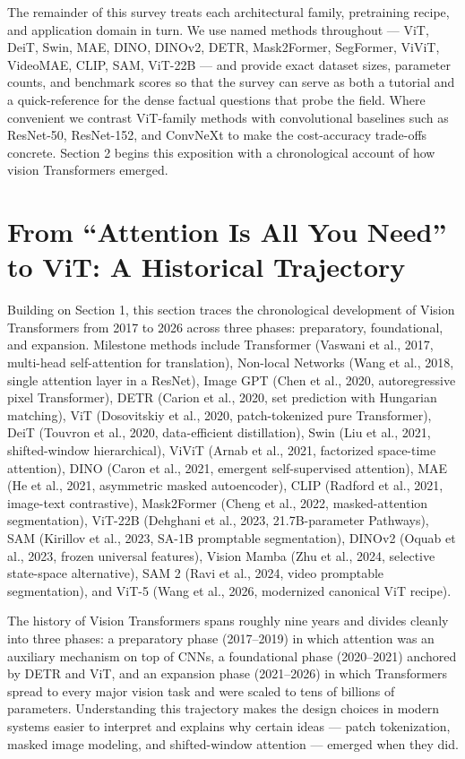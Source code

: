 The remainder of this survey treats each architectural family, pretraining recipe, and application domain in turn. We use named methods throughout --- ViT, DeiT, Swin, MAE, DINO, DINOv2, DETR, Mask2Former, SegFormer, ViViT, VideoMAE, CLIP, SAM, ViT-22B --- and provide exact dataset sizes, parameter counts, and benchmark scores so that the survey can serve as both a tutorial and a quick-reference for the dense factual questions that probe the field. Where convenient we contrast ViT-family methods with convolutional baselines such as ResNet-50, ResNet-152, and ConvNeXt to make the cost-accuracy trade-offs concrete. Section 2 begins this exposition with a chronological account of how vision Transformers emerged.

\section{From ``Attention Is All You Need'' to ViT: A Historical Trajectory}\label{from-attention-is-all-you-need-to-vit-a-historical-trajectory}

Building on Section 1, this section traces the chronological development of Vision Transformers from 2017 to 2026 across three phases: preparatory, foundational, and expansion. Milestone methods include Transformer (Vaswani et al., 2017, multi-head self-attention for translation), Non-local Networks (Wang et al., 2018, single attention layer in a ResNet), Image GPT (Chen et al., 2020, autoregressive pixel Transformer), DETR (Carion et al., 2020, set prediction with Hungarian matching), ViT (Dosovitskiy et al., 2020, patch-tokenized pure Transformer), DeiT (Touvron et al., 2020, data-efficient distillation), Swin (Liu et al., 2021, shifted-window hierarchical), ViViT (Arnab et al., 2021, factorized space-time attention), DINO (Caron et al., 2021, emergent self-supervised attention), MAE (He et al., 2021, asymmetric masked autoencoder), CLIP (Radford et al., 2021, image-text contrastive), Mask2Former (Cheng et al., 2022, masked-attention segmentation), ViT-22B (Dehghani et al., 2023, 21.7B-parameter Pathways), SAM (Kirillov et al., 2023, SA-1B promptable segmentation), DINOv2 (Oquab et al., 2023, frozen universal features), Vision Mamba (Zhu et al., 2024, selective state-space alternative), SAM 2 (Ravi et al., 2024, video promptable segmentation), and ViT-5 (Wang et al., 2026, modernized canonical ViT recipe).

The history of Vision Transformers spans roughly nine years and divides cleanly into three phases: a preparatory phase (2017--2019) in which attention was an auxiliary mechanism on top of CNNs, a foundational phase (2020--2021) anchored by DETR and ViT, and an expansion phase (2021--2026) in which Transformers spread to every major vision task and were scaled to tens of billions of parameters. Understanding this trajectory makes the design choices in modern systems easier to interpret and explains why certain ideas --- patch tokenization, masked image modeling, and shifted-window attention --- emerged when they did.

